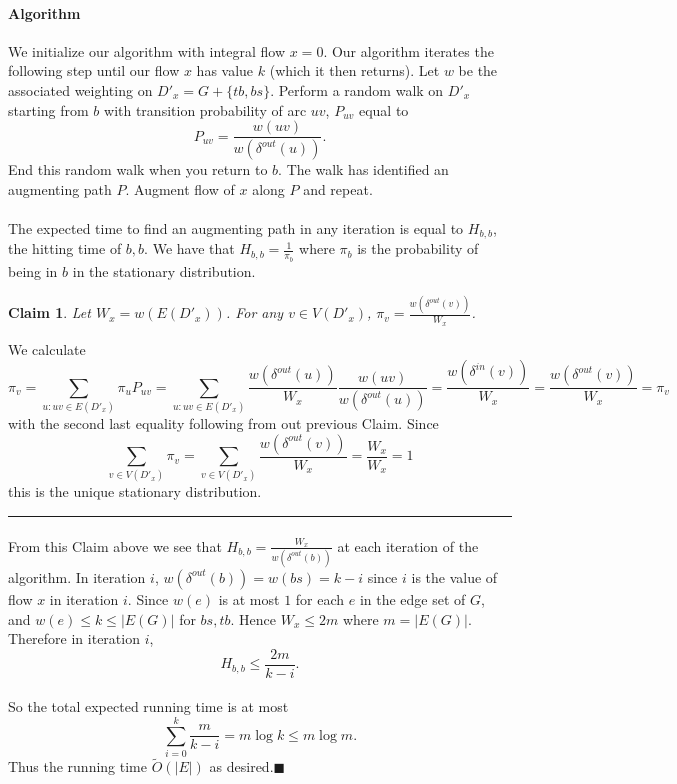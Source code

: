 \documentclass[letterpaper,12pt,oneside,onecolumn]{article}
\newenvironment{proof}{{\bf Proof:  }}{\hfill\rule{2mm}{2mm}}
\newtheorem{claim}[fact]{Claim}
\begin{document}
	\paragraph{Algorithm}
	We initialize our algorithm with integral flow $x = 0$. Our algorithm iterates the following step until our flow $x$ has value $k$ (which it then returns). Let $w$ be the associated weighting on $D'_{x} = G + \{tb,bs\}$. Perform a random walk on $D'_x$ starting from $b$ with transition probability of arc $uv$, $P_{uv}$ equal to 
	$$P_{uv} = \frac{w(uv)}{w(\delta^{out}(u))}.$$
	End this random walk when you return to $b$. The walk has identified an augmenting path $P$. Augment flow of $x$ along $P$ and repeat.
	\paragraph{}
	The expected time to find an augmenting path in any iteration is equal to $H_{b,b}$, the hitting time of $b,b$. We have that $H_{b,b} = \frac{1}{\pi_b}$ where $\pi_b$ is the probability of being in $b$ in the stationary distribution.
	\begin{claim}
		Let $W_x = w(E(D'_x))$. For any $v \in V(D'_x)$, $\pi_v = \frac{w(\delta^{out}(v))}{W_x}$.
	\end{claim}
	\begin{proof}
		We calculate
		$$\pi_v = \sum_{u: uv \in E(D'_x)} \pi_uP_{uv} = \sum_{u:uv \in E(D'_x)} \frac{w(\delta^{out}(u))}{W_x}\frac{w(uv)}{w(\delta^{out}(u))} = \frac{w(\delta^{in}(v))}{W_x} = \frac{w(\delta^{out}(v))}{W_x} = \pi_v$$
		with the second last equality following from out previous Claim. Since 
		$$\sum_{v \in V(D'_x)} \pi_v = \sum_{v\in V(D'_x)} \frac{w(\delta^{out}(v))}{W_x} = \frac{W_x}{W_x} = 1$$
		this is the unique stationary distribution.
	\end{proof}
	\paragraph{}
	From this Claim above we see that $H_{b,b} = \frac{W_x}{w(\delta^{out}(b))}$ at each iteration of the algorithm.
	In iteration $i$, $w(\delta^{out}(b)) = w(bs) = k-i$ since $i$ is the value of flow $x$ in iteration $i$. Since $w(e)$ is at most $1$ for each $e$ in the edge set of $G$, and $w(e) \leq k\leq |E(G)|$ for $bs, tb$. Hence $W_x \leq 2m$ where $m = |E(G)|$. Therefore in iteration $i$,
	$$H_{b,b} \leq \frac{2m}{k-i}.$$
	\paragraph{}
	So the total expected running time is at most
	$$\sum_{i=0}^k\frac{m}{k-i} = m\log k \leq m\log m.$$
	Thus the running time $\tilde{O}(|E|)$ as desired.$\blacksquare$
	\newpage
\end{document}
